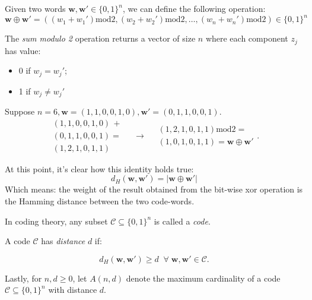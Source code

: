 \begin{definition}
Given two words $\textbf{w}, \textbf{w}' \in \{0,1\}^n$, we can define the following operation:
\begin{equation}
    \textbf{w} \oplus \textbf{w}' = ((w_1 + w_1')\text{mod}2, (w_2 + w_2')\text{mod}2, \ldots, (w_n + w_n')\text{mod}2) \in \{0,1\}^n
\end{equation}
\end{definition}
The \emph{sum modulo 2} operation returns a vector of size $n$ where each component  $z_j$ has value:
\begin{itemize}
    \item 0 if $w_j = w_j'$;
    \item 1 if $w_j \neq w_j'$
\end{itemize}

\begin{example}
Suppose $n=6, \textbf{w} = (1, 1, 0, 0, 1, 0), \textbf{w}' = (0, 1, 1, 0, 0, 1)$.
\begin{equation}
\begin{array}{l}
(1, 1, 0, 0, 1, 0) \,+ \\
(0, 1, 1, 0, 0, 1) = \\  \hline
(1, 2, 1, 0, 1, 1)
\end{array}
\quad\rightarrow\quad
\begin{array}{l}
(1, 2, 1, 0, 1, 1)\text{mod} 2 = \\ \hline
(1, 0, 1, 0, 1, 1) = \textbf{w} \oplus \textbf{w}'
\end{array}.
\end{equation}
\end{example}

At this point, it's clear how this identity holds true:
\begin{equation}
    d_H(\textbf{w}, \textbf{w}') = |\textbf{w} \oplus \textbf{w}'|
\end{equation}
Which means: the weight of the result obtained from the bit-wise xor operation is the Hamming distance between the two code-words.

\begin{definition}
In coding theory, any subset $\mathcal{C} \subseteq \{0,1\}^n$ is called a \emph{code}.

A code $\mathcal{C}$ has \emph{distance} $d$ if:

\begin{equation}
    d_H(\textbf{w}, \textbf{w}') \geq d \;\; \forall \;\textbf{w}, \textbf{w}' \in \mathcal{C}.
\end{equation}

Lastly, for $n, d \geq 0$, let $A(n,d)$ denote the maximum cardinality of a code $\mathcal{C} \subseteq \{0,1\}^n$ with distance $d$.
\end{definition}

